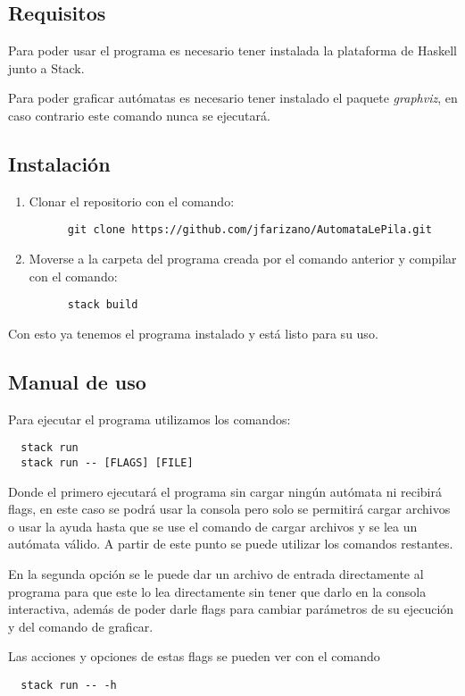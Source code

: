 \documentclass[12pt,a4paper]{article}
\begin{document}
\subsection{Requisitos}
Para poder usar el programa es necesario tener instalada la plataforma de Haskell
junto a Stack. 

Para poder graficar autómatas es necesario tener instalado el 
paquete \emph{graphviz}, en caso contrario este comando nunca se ejecutará.

\subsection{Instalación}
\begin{enumerate}
  \item Clonar el repositorio con el comando:
    \begin{verbatim}
      git clone https://github.com/jfarizano/AutomataLePila.git
    \end{verbatim}
  \item Moverse a la carpeta del programa creada por el comando anterior y compilar con el comando:
    \begin{verbatim}
      stack build
    \end{verbatim}
\end{enumerate}
Con esto ya tenemos el programa instalado y está listo para su uso.

\subsection{Manual de uso}
Para ejecutar el programa utilizamos los comandos:
\begin{verbatim}
  stack run
  stack run -- [FLAGS] [FILE]
\end{verbatim}
Donde el primero ejecutará el programa sin cargar ningún autómata ni 
recibirá flags, en este caso se podrá usar la consola pero solo se permitirá
cargar archivos o usar la ayuda hasta que se use el comando de cargar archivos y
se lea un autómata válido. A partir de este punto se puede utilizar los comandos restantes.

En la segunda opción se le puede dar un archivo de entrada directamente al programa
para que este lo lea directamente sin tener que darlo en la consola interactiva, 
además de poder darle flags para cambiar parámetros de su ejecución y del comando de graficar.

Las acciones y opciones de estas flags se pueden ver con el comando
\begin{verbatim}
  stack run -- -h
\end{verbatim}
\end{document}
